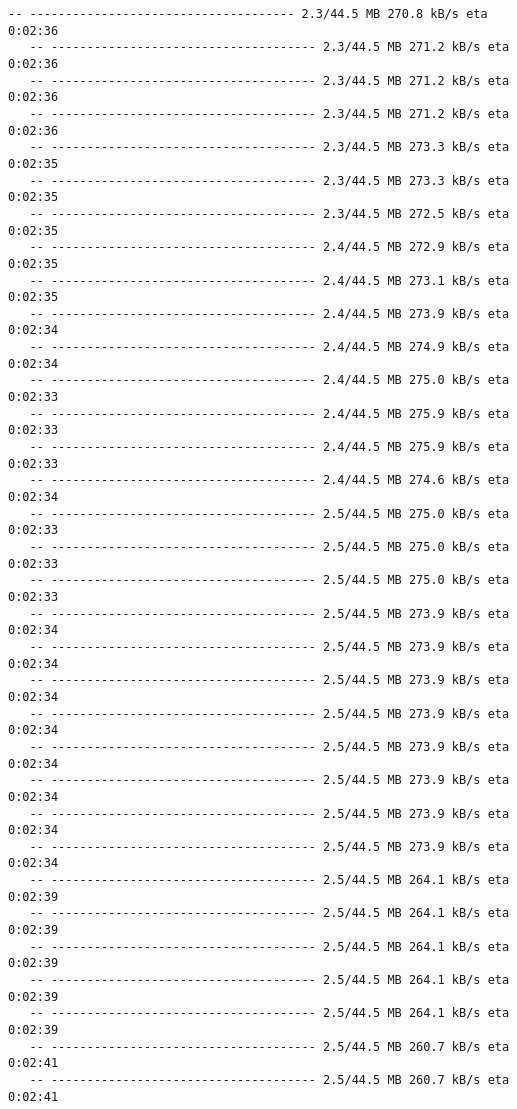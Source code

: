 \documentclass[11pt]{article}
\begin{document}
\begin{Verbatim}[commandchars=\\\{\}]
   -- ------------------------------------- 2.3/44.5 MB 270.8 kB/s eta 0:02:36
   -- ------------------------------------- 2.3/44.5 MB 271.2 kB/s eta 0:02:36
   -- ------------------------------------- 2.3/44.5 MB 271.2 kB/s eta 0:02:36
   -- ------------------------------------- 2.3/44.5 MB 271.2 kB/s eta 0:02:36
   -- ------------------------------------- 2.3/44.5 MB 273.3 kB/s eta 0:02:35
   -- ------------------------------------- 2.3/44.5 MB 273.3 kB/s eta 0:02:35
   -- ------------------------------------- 2.3/44.5 MB 272.5 kB/s eta 0:02:35
   -- ------------------------------------- 2.4/44.5 MB 272.9 kB/s eta 0:02:35
   -- ------------------------------------- 2.4/44.5 MB 273.1 kB/s eta 0:02:35
   -- ------------------------------------- 2.4/44.5 MB 273.9 kB/s eta 0:02:34
   -- ------------------------------------- 2.4/44.5 MB 274.9 kB/s eta 0:02:34
   -- ------------------------------------- 2.4/44.5 MB 275.0 kB/s eta 0:02:33
   -- ------------------------------------- 2.4/44.5 MB 275.9 kB/s eta 0:02:33
   -- ------------------------------------- 2.4/44.5 MB 275.9 kB/s eta 0:02:33
   -- ------------------------------------- 2.4/44.5 MB 274.6 kB/s eta 0:02:34
   -- ------------------------------------- 2.5/44.5 MB 275.0 kB/s eta 0:02:33
   -- ------------------------------------- 2.5/44.5 MB 275.0 kB/s eta 0:02:33
   -- ------------------------------------- 2.5/44.5 MB 275.0 kB/s eta 0:02:33
   -- ------------------------------------- 2.5/44.5 MB 273.9 kB/s eta 0:02:34
   -- ------------------------------------- 2.5/44.5 MB 273.9 kB/s eta 0:02:34
   -- ------------------------------------- 2.5/44.5 MB 273.9 kB/s eta 0:02:34
   -- ------------------------------------- 2.5/44.5 MB 273.9 kB/s eta 0:02:34
   -- ------------------------------------- 2.5/44.5 MB 273.9 kB/s eta 0:02:34
   -- ------------------------------------- 2.5/44.5 MB 273.9 kB/s eta 0:02:34
   -- ------------------------------------- 2.5/44.5 MB 273.9 kB/s eta 0:02:34
   -- ------------------------------------- 2.5/44.5 MB 273.9 kB/s eta 0:02:34
   -- ------------------------------------- 2.5/44.5 MB 264.1 kB/s eta 0:02:39
   -- ------------------------------------- 2.5/44.5 MB 264.1 kB/s eta 0:02:39
   -- ------------------------------------- 2.5/44.5 MB 264.1 kB/s eta 0:02:39
   -- ------------------------------------- 2.5/44.5 MB 264.1 kB/s eta 0:02:39
   -- ------------------------------------- 2.5/44.5 MB 264.1 kB/s eta 0:02:39
   -- ------------------------------------- 2.5/44.5 MB 260.7 kB/s eta 0:02:41
   -- ------------------------------------- 2.5/44.5 MB 260.7 kB/s eta 0:02:41

\end{Verbatim}
\end{document}
